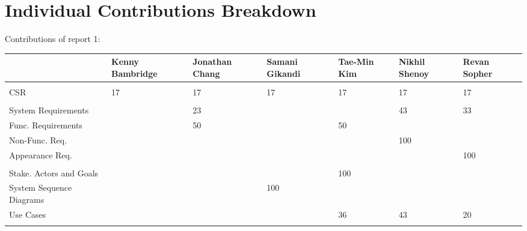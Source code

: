 \documentclass[letterpaper,english, 12pt]{scrreprt}
\begin{document}
\chapter*{Individual Contributions Breakdown}
Contributions of report 1:\\
\begin{center}
	\begin{tabular}{|l|C{2cm}|C{1.5cm}|C{1.5cm}|C{1.5cm}|C{1.5cm}|C{1.5cm}|}
		\hline
                        &Kenny Bambridge& Jonathan Chang& Samani Gikandi& Tae-Min Kim   & Nikhil Shenoy & Revan Sopher  \\ \hline
                        &               &               &               &               &               &               \\ \hline
CSR                     &      17       &      17       &       17      &      17       &       17      &       17      \\ \hline
                        &               &               &               &               &               &               \\ \hline

System Requirements     &               &      23       &               &               &       43      &       33      \\ \hline
Func. Requirements      &               &      50       &               &      50       &               &               \\ \hline
Non-Func. Req.          &               &               &               &               &      100      &               \\ \hline
Appearance Req.         &               &               &               &               &               &      100      \\ \hline
                        &               &               &               &               &               &               \\ \hline

Stake. Actors and Goals &               &               &               &     100       &               &               \\ \hline
System Sequence Diagrams&               &               &      100      &               &               &               \\ \hline
Use Cases               &               &               &               &      36       &       43      &       20      \\ \hline
                        &               &               &               &               &               &               \\ \hline


\end{tabular}
\end{center}
\end{document}
